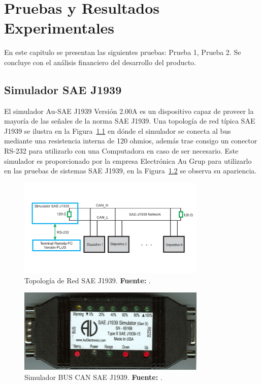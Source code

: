 \chapter[Pruebas y Resultados Experimentales]{Pruebas y Resultados Experimentales}

En este capitulo se presentan las siguientes pruebas: Prueba 1, Prueba 2. Se concluye con el análisis financiero del desarrollo del producto.

\section{Simulador SAE J1939}

El simulador Au-SAE J1939 Versión 2.00A es un dispositivo capaz de proveer la mayoría de las señales de la norma SAE J1939. 
Una topología de red típica SAE J1939 se ilustra en la Figura~\ref{TPSAE} en dónde el simulador se conecta al bus mediante una resistencia interna de 120 ohmios, además trae consigo un conector RS-232 para utilizarlo con una Computadora en caso de ser necesario. 
Este simulador es proporcionado por la empresa Electrónica Au Grup para utilizarlo en las pruebas de sistemas SAE J1939, en la Figura~\ref{Sim} se observa su apariencia. 

\begin{figure}[H]
	\centering
		\includegraphics[width=0.8\textwidth]{./Cap6imagen/EjemploSimulador.pdf}
	\caption[Topología de Red SAE J1939.]{Topología de Red SAE J1939.\textbf{ Fuente:} \cite{UserM}.}
	\label{TPSAE} %
\end{figure}



\begin{figure}[H]
	\centering
		\includegraphics[width=0.8\textwidth]{./Cap6imagen/Simulador.png}
	\caption[Simulador BUS CAN SAE J1939.]{Simulador BUS CAN SAE J1939.\textbf{ Fuente:} \cite{UserM}.}
	\label{Sim} %
\end{figure}


